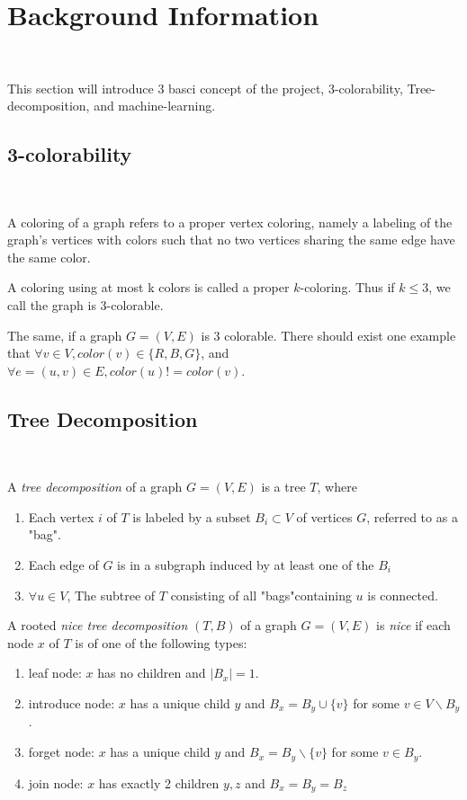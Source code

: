 \section{Background Information}~\label{sec.background}

This section will introduce 3 basci concept of the project, 3-colorability, Tree-decomposition, and machine-learning.

\subsection{3-colorability}~\label{sec.subbackground1}

A coloring of a graph refers to a proper vertex coloring, namely a labeling of the graph's vertices with colors such that no two vertices sharing the same edge have the same color.

A coloring using at most k colors is called a proper $k$-coloring. Thus if $k\le 3$, we call the graph is 3-colorable.

The same, if a graph $G=(V, E)$ is 3 colorable. There should exist one example that $\forall v \in V, color(v) \in \{R, B, G\}$, and $\forall e = (u, v) \in E, color(u) != color(v)$.

\subsection{Tree Decomposition}~\label{sec.subbackground2}

A \textit{tree decomposition} of a graph $G=(V, E)$ is a tree $T$, where

\begin{enumerate}
    \item Each vertex $i$ of $T$ is labeled by a subset $B_{i} \subset V$ of vertices $G$, referred to as a "bag".
    \item Each edge of $G$ is in a subgraph induced by at least one of the $B_{i}$
    \item $\forall u \in V$, The subtree of $T$ consisting of all "bags"containing $u$ is connected.
\end{enumerate}

A rooted \textit{nice tree decomposition} $(T, B)$ of a graph $G=(V, E)$ is \textit{nice} if each node $x$ of $T$ is of one of the following types:

\begin{enumerate}
    \item leaf node: $x$ has no children and $|B_{x}| = 1$.
    \item introduce node: $x$ has a unique child $y$ and $B_{x}=B_{y}\cup\{v\}$ for some $v \in V \backslash B_{y}$.
    \item forget node: $x$ has a unique child $y$ and $B_{x}=B_{y}\backslash\{v\}$ for some $v \in B_{y}$.
    \item join node: $x$ has exactly 2 children $y, z$ and $B_{x}=B_{y}=B_{z}$
\end{enumerate}

